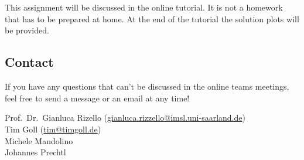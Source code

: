 \section*{\assigment}

This assignment will be discussed in the online tutorial. It is not a homework that has to be prepared at home. At the end of the tutorial the solution plots will be provided.

\subsection*{Contact}

If you have any questions that can't be discussed in the online teams meetings, feel free to send a message or an email at any time!

\noindent
Prof.\ Dr.\ Gianluca Rizello (\url{gianluca.rizzello@imsl.uni-saarland.de}) \\
Tim Goll (\url{tim@timgoll.de}) \\
Michele Mandolino\\
Johannes Prechtl
